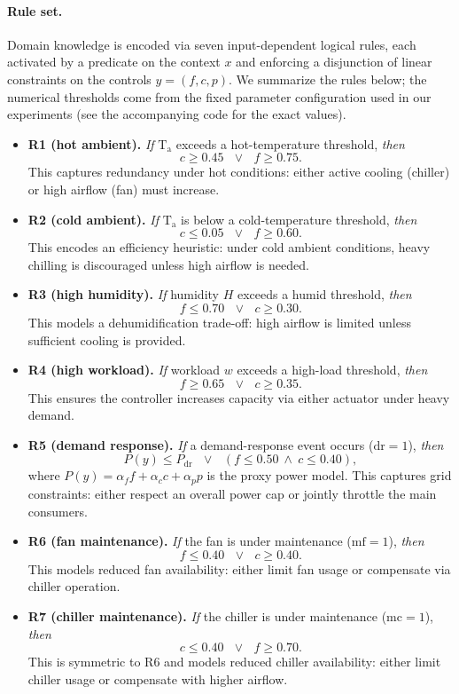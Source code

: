 \documentclass{article}
\theoremstyle{plain}
\theoremstyle{definition}
\theoremstyle{remark}
\begin{document}
\paragraph{Rule set.}
Domain knowledge is encoded via seven input-dependent logical rules, each activated by a predicate on the context $x$ and enforcing a disjunction of linear constraints on the controls $y=(f,c,p)$.
We summarize the rules below; the numerical thresholds come from the fixed parameter configuration used in our experiments (see the accompanying code for the exact values).

\begin{itemize}
    \item \textbf{R1 (hot ambient).}
    \emph{If} $\mathrm{T_a}$ exceeds a hot-temperature threshold, \emph{then}
    \[
    c \ge 0.45 \ \ \ \lor\ \ \ f \ge 0.75.
    \]
    This captures redundancy under hot conditions: either active cooling (chiller) or high airflow (fan) must increase.

    \item \textbf{R2 (cold ambient).}
    \emph{If} $\mathrm{T_a}$ is below a cold-temperature threshold, \emph{then}
    \[
    c \le 0.05 \ \ \ \lor\ \ \ f \ge 0.60.
    \]
    This encodes an efficiency heuristic: under cold ambient conditions, heavy chilling is discouraged unless high airflow is needed.

    \item \textbf{R3 (high humidity).}
    \emph{If} humidity $H$ exceeds a humid threshold, \emph{then}
    \[
    f \le 0.70 \ \ \ \lor\ \ \ c \ge 0.30.
    \]
    This models a dehumidification trade-off: high airflow is limited unless sufficient cooling is provided.

    \item \textbf{R4 (high workload).}
    \emph{If} workload $w$ exceeds a high-load threshold, \emph{then}
    \[
    f \ge 0.65 \ \ \ \lor\ \ \ c \ge 0.35.
    \]
    This ensures the controller increases capacity via either actuator under heavy demand.

    \item \textbf{R5 (demand response).}
    \emph{If} a demand-response event occurs ($\mathrm{dr}=1$), \emph{then}
    \[
    P(y)\le P_{\mathrm{dr}}
    \ \ \ \lor\ \ \
    (f \le 0.50 \ \wedge\  c \le 0.40),
    \]
    where $P(y)=\alpha_f f+\alpha_c c+\alpha_p p$ is the proxy power model.
    This captures grid constraints: either respect an overall power cap or jointly throttle the main consumers.

    \item \textbf{R6 (fan maintenance).}
    \emph{If} the fan is under maintenance ($\mathrm{mf}=1$), \emph{then}
    \[
    f \le 0.40 \ \ \ \lor\ \ \ c \ge 0.40.
    \]
    This models reduced fan availability: either limit fan usage or compensate via chiller operation.

    \item \textbf{R7 (chiller maintenance).}
    \emph{If} the chiller is under maintenance ($\mathrm{mc}=1$), \emph{then}
    \[
    c \le 0.40 \ \ \ \lor\ \ \ f \ge 0.70.
    \]
    This is symmetric to R6 and models reduced chiller availability: either limit chiller usage or compensate with higher airflow.
\end{itemize}
\end{document}
